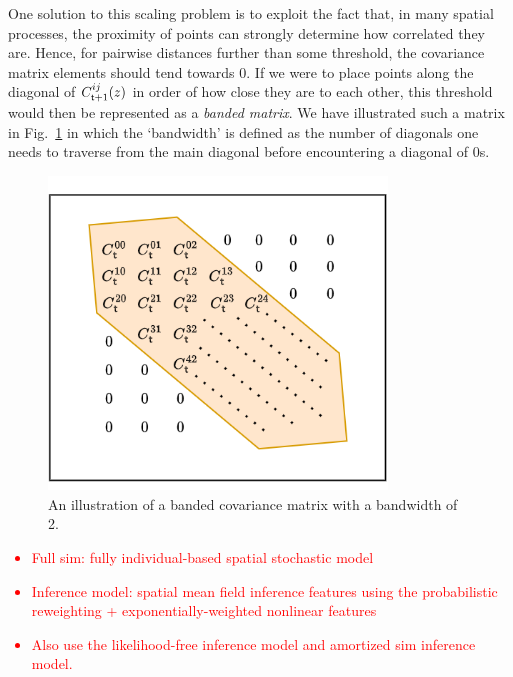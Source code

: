 One solution to this scaling problem is to exploit the fact that, in many spatial processes, the proximity of points can strongly determine how correlated they are. Hence, for pairwise distances further than some threshold, the covariance matrix elements should tend towards 0. If we were to place points along the diagonal of $C^{ij}_{{\sf t}+1}(z)$ in order of how close they are to each other, this threshold would then be represented as a \emph{banded matrix}. We have illustrated such a matrix in Fig.~\ref{fig:banded-matrix} in which the `bandwidth' is defined as the number of diagonals one needs to traverse from the main diagonal before encountering a diagonal of 0s.

\begin{figure}[h]
\centering
\includegraphics[width=9cm]{images/chapter-7-banded-matrix.drawio.png}
\caption{An illustration of a banded covariance matrix with a bandwidth of 2.}
\label{fig:banded-matrix}
\end{figure}

\textcolor{red}{
\begin{itemize}
\item{Full sim: fully individual-based spatial stochastic model}
\item{Inference model: spatial mean field inference features using the probabilistic reweighting + exponentially-weighted nonlinear features}
\item{Also use the likelihood-free inference model and amortized sim inference model.}
\end{itemize}
}

